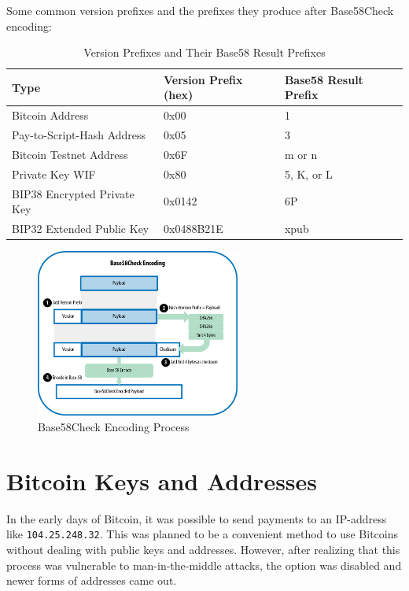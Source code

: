 \documentclass{article}
\begin{document}
  Some common version prefixes and the prefixes they produce after Base58Check encoding:

  \begin{table}[H]
  \centering
  \begin{tabular}{|l|l|l|}
  \hline
  \textbf{Type} & \textbf{Version Prefix (hex)} & \textbf{Base58 Result Prefix} \\
  \hline
  Bitcoin Address & 0x00 & 1 \\
  Pay-to-Script-Hash Address & 0x05 & 3 \\
  Bitcoin Testnet Address & 0x6F & m or n \\
  Private Key WIF & 0x80 & 5, K, or L \\
  BIP38 Encrypted Private Key & 0x0142 & 6P \\
  BIP32 Extended Public Key & 0x0488B21E & xpub \\
  \hline
  \end{tabular}
  \caption{Version Prefixes and Their Base58 Result Prefixes}
  \end{table}

  \begin{figure}[H]
  \centering
  \includegraphics[width=0.6\textwidth]{img/checksum.png}
  \caption{Base58Check Encoding Process}
  \end{figure}

\section{Bitcoin Keys and Addresses}

  In the early days of Bitcoin, it was possible to send payments to an IP-address like \texttt{104.25.248.32}. This was planned to be a convenient method to use Bitcoins without dealing with public keys and addresses. However, after realizing that this process was vulnerable to man-in-the-middle attacks, the option was disabled and newer forms of addresses came out.
\end{document}
